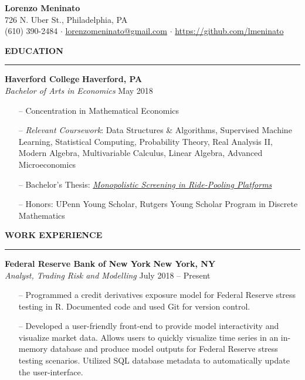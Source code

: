 \documentclass[paper=a4, fontsize=11pt]{scrartcl} %
\newcommand{\I}{--}
\newenvironment{mycenter}[1][\topsep]
  {\setlength{\topsep}{#1}\par\kern\topsep\centering}%
  {\par\kern\topsep}%
\newcommand*{\email}[1]{%
  \normalsize\href{mailto:#1}{#1}
  }
\begin{document}
\begin{mycenter}
\textbf{\LARGE Lorenzo Meninato} \\
726 N. Uber St., Philadelphia, PA \\
(610) 390-2484 $\cdot$ \email{lorenzomeninato@gmail.com} $\cdot$ \href{https://github.com/lmeninato}{https://github.com/lmeninato}

\end{mycenter}

\begin{mycenter}[0pt]
\textsc{\textbf{EDUCATION}}
\end{mycenter}

\vspace{-3mm}
\rule{\textwidth}{0.4pt}

\textbf{Haverford College} \hfill  \textbf{Haverford, PA} \\
\textit{Bachelor of Arts in Economics} \hfill May 2018

\begin{itemize}[topsep=0pt,noitemsep]
    \item[\I] Concentration in Mathematical Economics
	\item[\I] \textit{Relevant Coursework}: Data Structures \& Algorithms, Supervised Machine Learning, Statistical Computing, Probability Theory, Real Analysis II, Modern Algebra, Multivariable Calculus, Linear Algebra, Advanced Microeconomics
	\item[\I] Bachelor's Thesis: \textit{\href{https://github.com/lmeninato/ECON396/blob/master/Lorenzo\%20Meninato\%20Thesis.pdf}{Monopolistic Screening in Ride-Pooling Platforms}}
	\item[\I] Honors: UPenn Young Scholar, Rutgers Young Scholar Program in Discrete Mathematics
\end{itemize}

\vspace{2mm}

\begin{mycenter}[0pt]
\textsc{\textbf{WORK EXPERIENCE}}
\end{mycenter}

\vspace{-3mm}
\rule{\textwidth}{0.4pt}

\textbf{Federal Reserve Bank of New York} \hfill \textbf{New York, NY} \\
\textit{Analyst, Trading Risk and Modelling} \hfill July 2018 -- Present
\begin{itemize}[topsep=0pt,noitemsep]
	\item[\I] Programmed a credit derivatives exposure model for Federal Reserve stress testing in R. Documented code and used Git for version control.
	\item[\I] Developed a user-friendly front-end to provide model interactivity and visualize market data. Allows users to quickly visualize time series in an in-memory database and produce model outputs for Federal Reserve stress testing scenarios. Utilized SQL database metadata to automatically update the user-interface. 
\end{itemize}
\end{document}
